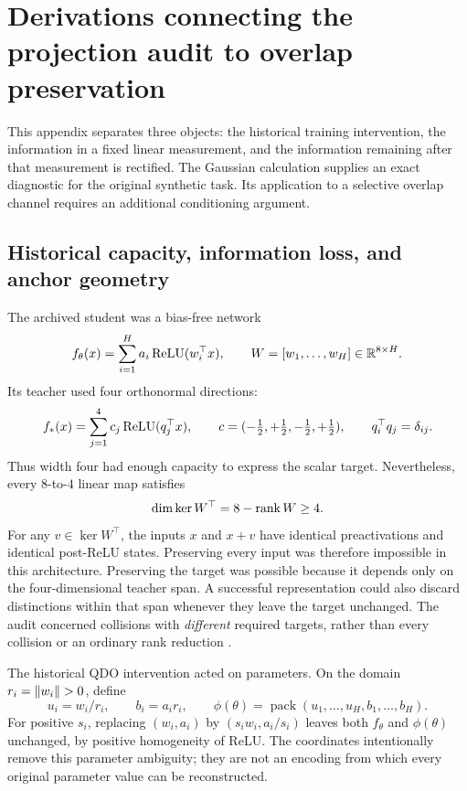 \section{Derivations connecting the projection audit to overlap preservation}
\label{qdo:appendix}

This appendix separates three objects: the historical training intervention,
the information in a fixed linear measurement, and the information remaining
after that measurement is rectified. The Gaussian calculation supplies an
exact diagnostic for the original synthetic task. Its application to a
selective overlap channel requires an additional conditioning argument.

\subsection{Historical capacity, information loss, and anchor geometry}
\label{qdo:historical}

The archived student was a bias-free network
\begin{equation}
 f_\theta(x)=\sum_{i=1}^{H}a_i\operatorname{ReLU}(w_i^\top x),
 \qquad W=[w_1,\ldots,w_H]\in\mathbb R^{8\times H}.
 \label{qdo:student}
\end{equation}
Its teacher used four orthonormal directions:
\begin{equation}
 f_*(x)=\sum_{j=1}^{4}c_j\operatorname{ReLU}(q_j^\top x),\qquad
 c=(-\tfrac12,+\tfrac12,-\tfrac12,+\tfrac12),\qquad
 q_i^\top q_j=\delta_{ij}.
 \label{qdo:teacher}
\end{equation}
Thus width four had enough capacity to express the scalar target. Nevertheless,
every $8$-to-$4$ linear map satisfies
\begin{equation}
 \dim\ker W^\top=8-\operatorname{rank} W\ge4.
 \label{qdo:nullity}
\end{equation}
For any $v\in\ker W^\top$, the inputs $x$ and $x+v$ have identical
preactivations and identical post-ReLU states. Preserving every input was
therefore impossible in this architecture. Preserving the target was possible
because it depends only on the four-dimensional teacher span. A successful
representation could also discard distinctions within that span whenever they
leave the target unchanged. The audit concerned collisions with \emph{different}
required targets, rather than every collision or an ordinary rank reduction
\cite{qdo,projection}.

The historical QDO intervention acted on parameters. On the domain
$r_i=\left\lVert w_i\right\rVert>0$, define
\begin{equation}
 u_i=w_i/r_i,\qquad b_i=a_i r_i,\qquad
 \phi(\theta)=\operatorname{pack}(u_1,\ldots,u_H,b_1,\ldots,b_H).
 \label{qdo:canonical}
\end{equation}
For positive $s_i$, replacing $(w_i,a_i)$ by $(s_iw_i,a_i/s_i)$ leaves both
$f_\theta$ and $\phi(\theta)$ unchanged, by positive homogeneity of ReLU.
The coordinates intentionally remove this parameter ambiguity; they are not
an encoding from which every original parameter value can be reconstructed.

